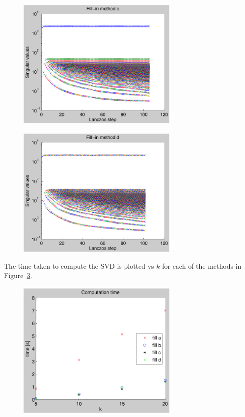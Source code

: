 \documentclass[11pt]{article} %
\begin{document}
\begin{figure}[h!]
  \centering
    \includegraphics[width=0.7\textwidth]{sv_c}
  \caption{}
\label{fig:sv_c}
\end{figure}

\begin{figure}[h!]
  \centering
    \includegraphics[width=0.7\textwidth]{sv_d}
  \caption{}
\label{fig:sv_d}
\end{figure}

The time taken to compute the SVD is plotted vs $k$ for each of the methods in Figure~\ref{fig:time}.

\begin{figure}[h!]
  \centering
    \includegraphics[width=0.7\textwidth]{time}
  \caption{}
\label{fig:time}
\end{figure}
\end{document}
